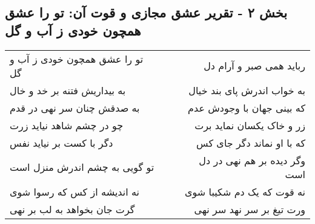 \begin{center}
\section*{بخش ۲ - تقریر عشق مجازی و قوت آن: تو را عشق همچون خودی ز آب و گل}
\label{sec:002}
\begin{longtable}{l p{0.5cm} r}
تو را عشق همچون خودی ز آب و گل
&&
رباید همی صبر و آرام دل
\\
به بیداریش فتنه بر خد و خال
&&
به خواب اندرش پای بند خیال
\\
به صدقش چنان سر نهی در قدم
&&
که بینی جهان با وجودش عدم
\\
چو در چشم شاهد نیاید زرت
&&
زر و خاک یکسان نماید برت
\\
دگر با کست بر نیاید نفس
&&
که با او نماند دگر جای کس
\\
تو گویی به چشم اندرش منزل است
&&
وگر دیده بر هم نهی در دل است
\\
نه اندیشه از کس که رسوا شوی
&&
نه قوت که یک دم شکیبا شوی
\\
گرت جان بخواهد به لب بر نهی
&&
ورت تیغ بر سر نهد سر نهی
\\
\end{longtable}
\end{center}
